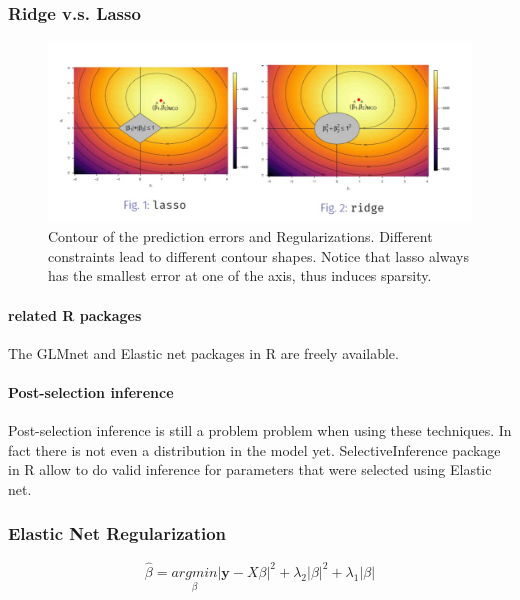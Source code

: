 \documentclass[11pt]{article}
\newcommand{\tb}[1]{\textbf{#1}}
\newcommand{\vy}[0]{\tb{y}}
\begin{document}
 \subsubsection{Ridge v.s. Lasso}
  \begin{figure}[h]
	\centering
	\includegraphics[scale=0.6]{vs.png}
	\caption{Contour of the prediction errors and Regularizations. Different constraints lead to different contour shapes. Notice that lasso always has the smallest error at one of the axis, thus induces sparsity.}
\end{figure}

 
 \paragraph{related R packages}
 The GLMnet and Elastic net packages in R are freely available.


 \paragraph{Post-selection inference}
 Post-selection inference is still a problem problem when using these techniques. In fact there is not even a distribution in the model yet. SelectiveInference package in R allow to do valid inference for parameters that were selected using Elastic net.
 
 \subsubsection{Elastic Net Regularization}
 $$\hat{\beta} = \underset{\beta}{argmin} |\vy - X\beta|^2 + \lambda_2|\beta|^2 + \lambda_1 |\beta|$$
\end{document}
